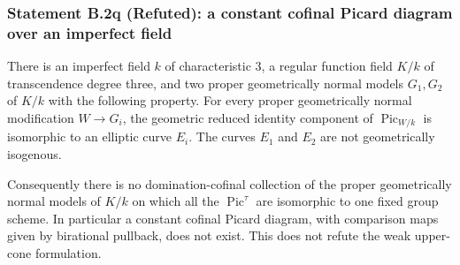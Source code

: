 \subsubsection*{Statement B.2q (Refuted): a constant cofinal Picard diagram over an imperfect field}
\begin{theorem}
\label{B:B2-cofinal-counterexample}
There is an imperfect field $k$ of characteristic $3$, a regular
function field $K/k$ of transcendence degree three, and two proper
geometrically normal models $G_1,G_2$ of $K/k$ with the following
property.  For every proper geometrically normal modification
$W\to G_i$, the geometric reduced identity component of
$\operatorname{Pic}_{W/k}$ is isomorphic to an elliptic curve
$E_i$.  The curves $E_1$ and $E_2$ are not geometrically isogenous.

Consequently there is no domination-cofinal collection of the
proper geometrically normal models of $K/k$ on which all the
$\operatorname{Pic}^{\tau}$ are isomorphic to one fixed group
scheme.  In particular a constant cofinal Picard diagram, with
comparison maps given by birational pullback, does not exist.
This does not refute the weak upper-cone formulation.
\end{theorem}

